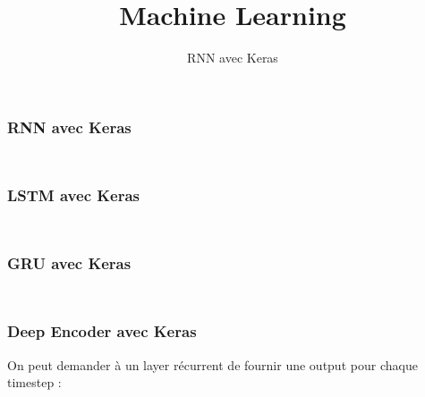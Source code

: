 \documentclass{formation}
\title{Machine Learning}
\subtitle{RNN avec Keras}
\begin{document}
\maketitle

\begin{frame}
  \frametitle{RNN avec Keras}
  \inputminted[linenos,fontsize=\small,bgcolor=pythonbg]{python}{code-illustration/tf-keras-rnn.py}
  \inputminted[linenos,fontsize=\small,bgcolor=returnbg]{python}{code-illustration/tf-keras-rnn.txt}
\end{frame}

\begin{frame}
  \frametitle{LSTM avec Keras}
  \inputminted[linenos,fontsize=\small,bgcolor=pythonbg]{python}{code-illustration/tf-keras-lstm.py}
  \inputminted[linenos,fontsize=\small,bgcolor=returnbg]{python}{code-illustration/tf-keras-lstm.txt}
\end{frame}

\begin{frame}
  \frametitle{GRU avec Keras}
  \inputminted[linenos,fontsize=\small,bgcolor=pythonbg]{python}{code-illustration/tf-keras-gru.py}
  \inputminted[linenos,fontsize=\small,bgcolor=returnbg]{python}{code-illustration/tf-keras-gru.txt}
\end{frame}

\begin{frame}
  \frametitle{Deep Encoder avec Keras}
  On peut demander à un layer récurrent de fournir une output pour chaque timestep :
  \inputminted[linenos,fontsize=\small,bgcolor=pythonbg]{python}{code-illustration/tf-keras-rnn-all-timestep.py}
  \inputminted[linenos,fontsize=\small,bgcolor=returnbg]{python}{code-illustration/tf-keras-gru.txt}
\end{frame}
\end{document}
